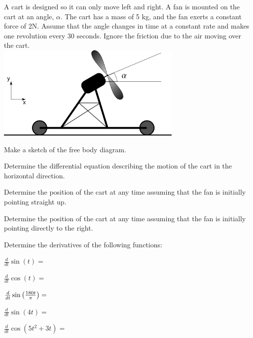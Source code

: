 \begin{problem}
\end{problem}

\begin{problem}
\item A cart is designed so it can only move left and right. A fan is
  mounted on the cart at an angle, $\alpha$. The cart has a mass of 5
  kg, and the fan exerts a constant force of 2N. Assume that the angle
  changes in time at a constant rate and makes one revolution every 30
  seconds. Ignore the friction due to the air moving
  over the cart.  \\
  \includegraphics[width=9cm]{ink/week6/airCart}
  \begin{subproblem}
    \item Make a sketch of the free body diagram.
      \vfill
    \item Determine the differential equation describing the motion
      of the cart in the horizontal direction.
      \vfill
      \clearpage
    \item Determine the position of the cart at any time assuming that
      the fan is initially pointing straight up.
      \vfill
    \item Determine the position of the cart at any time assuming that
      the fan is initially pointing directly to the right.
      \vfill
  \end{subproblem}

  \clearpage

\item Determine the derivatives of the following functions:
  \begin{subproblem}
    \item $\frac{d}{dt} \sin(t) = $ 
      \vfill
    \item $\frac{d}{dt} \cos(t) = $ 
      \vfill
    \item $\frac{d}{dt} \sin\left( \frac{180 t}{\pi}  \right) = $ 
      \vfill
    \item $\frac{d}{dt} \sin(4t) = $ 
      \vfill
    \item $\frac{d}{dt} \cos(5t^2+3t) = $ 
      \vfill
  \end{subproblem}


\end{problem}
